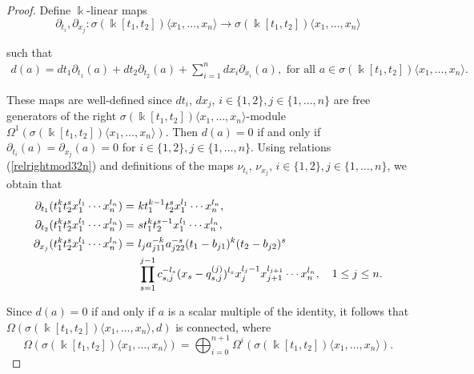 \documentclass{amsart}
\theoremstyle{definition}
\theoremstyle{remark}
\numberwithin{equation}{section}
\begin{document}
\begin{proof}
Define $\Bbbk$-linear maps $$
\partial_{t_i}, \partial_{x_j}: \sigma(\Bbbk[t_1, t_2])\langle x_1, \ldots, x_n\rangle \rightarrow \sigma(\Bbbk[t_1, t_2])\langle x_1, \ldots, x_n\rangle
$$ 

such that
\begin{align*}
d(a)=dt_1\partial_{t_1}(a)+dt_2\partial_{t_2}(a)+\sum_{i=1}^{n}dx_i\partial_{x_i}(a), \text{ for all } a \in \sigma(\Bbbk[t_1, t_2])\langle x_1, \ldots, x_n\rangle.
\end{align*}

These maps are well-defined since $dt_i$, $dx_j$, $i\in\{1, 2\}, j \in\{1, \ldots, n\}$ are free generators of the right $\sigma(\Bbbk[t_1, t_2])\langle x_1, \ldots, x_n\rangle$-module $\Omega^1(\sigma(\Bbbk[t_1, t_2])\langle x_1, \ldots, x_n\rangle)$. Then $d(a)=0$ if and only if $\partial_{t_i}(a)=\partial_{x_j}(a)=0$ for $i\in\{1, 2\}, j \in\{1, \ldots, n\}$. Using relations {\rm (}\ref{relrightmod32n}{\rm )} and definitions of the maps $\nu_{t_i}$, $\nu_{x_j}$, $i\in\{1, 2\}, j \in\{1, \ldots, n\}$, we obtain that
\begin{align}
\partial_{t_1}(t_1^kt_2^{s}x_1^{l_1}\cdots x_n^{l_n}) = &\ kt_1^{k-1}t_2^{s}x_1^{l_1}\cdots x_n^{l_n}, \\
\partial_{t_2}(t_1^kt_2^{s}x_1^{l_1}\cdots x_n^{l_n}) = &\ st_1^kt_2^{s-1}x_1^{l_1}\cdots x_n^{l_n}, \notag \\
\partial_{x_j}(t_1^kt_2^{s}x_1^{l_1}\cdots x_n^{l_n}) = &\ l_ja_{j11}^{-k}a_{j22}^{-s}(t_1-b_{j1})^k(t_2-b_{j2})^s \\ \notag
&\ \prod_{s=1}^{j-1}c_{s,j}^{-l_s}(x_s-q_{s,j}^{(j)})^{l_s} x_j^{l_j-1}x_{j+1}^{l_{j+1}}\cdots x_n^{l_n}, \quad 1 \leq j \leq n. \notag 
\end{align}

Since $d(a)=0$ if and only if $a$ is a scalar multiple of the identity, it follows that $\Omega(\sigma(\Bbbk[t_1, t_2])\langle x_1, \ldots, x_n\rangle,d)$ is connected, where 
\[
\Omega(\sigma(\Bbbk[t_1, t_2])\langle x_1, \ldots, x_n\rangle) = \bigoplus_{i=0}^{n+1}\Omega^i(\sigma(\Bbbk[t_1, t_2])\langle x_1, \ldots, x_n\rangle).
\]


\end{proof}
\end{document}
